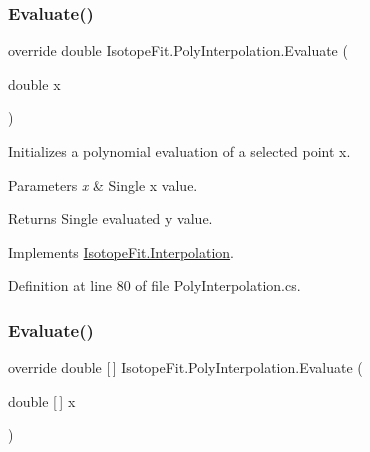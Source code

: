 \subsubsection{\texorpdfstring{Evaluate()}{Evaluate()}\hspace{0.1cm}{\footnotesize\ttfamily [1/2]}}
{\footnotesize\ttfamily override double Isotope\+Fit.\+Poly\+Interpolation.\+Evaluate (\begin{DoxyParamCaption}\item[{double}]{x }\end{DoxyParamCaption})\hspace{0.3cm}{\ttfamily [virtual]}}



Initializes a polynomial evaluation of a selected point x. 


\begin{DoxyParams}{Parameters}
{\em x} & Single x value.\\
\hline
\end{DoxyParams}
\begin{DoxyReturn}{Returns}
Single evaluated y value.
\end{DoxyReturn}


Implements \hyperlink{class_isotope_fit_1_1_interpolation}{Isotope\+Fit.\+Interpolation}.



Definition at line 80 of file Poly\+Interpolation.\+cs.

\mbox{\label{class_isotope_fit_1_1_poly_interpolation_ad6c5b40f7a718d934c5a3ed7f55c5eb3}} 
\subsubsection{\texorpdfstring{Evaluate()}{Evaluate()}\hspace{0.1cm}{\footnotesize\ttfamily [2/2]}}
{\footnotesize\ttfamily override double \mbox{[}$\,$\mbox{]} Isotope\+Fit.\+Poly\+Interpolation.\+Evaluate (\begin{DoxyParamCaption}\item[{double \mbox{[}$\,$\mbox{]}}]{x }\end{DoxyParamCaption})\hspace{0.3cm}{\ttfamily [virtual]}}



